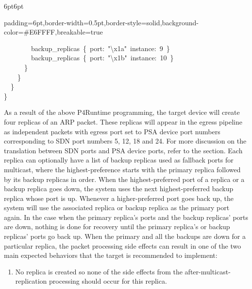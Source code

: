 \documentclass[11pt]{article}
\begin{document}
{\begin{mdbmargintb}{6pt}{6pt}
\begin{mdblock}{padding=6pt,border-width=0.5pt,border-style=solid,background-color=\#E6FFFF,breakable=true}
\begin{mdpre}
{{~~~~~~~~backup\_replicas~\{~port:~{"}{\textbackslash{}x1a}{"}~instance:~{9}~\}\\
~~~~~~~~backup\_replicas~\{~port:~{"}{\textbackslash{}x1b}{"}~instance:~{10}~\}\\
~~~~~~\}\\
~~~~\}\\
~~\}\\
\}}}%
\end{mdpre}%
\end{mdblock}%
\end{mdbmargintb}%

\noindent{}As a result of the above P4Runtime programming, the target device will create
four replicas of an ARP packet. These replicas will appear in the egress
pipeline as independent packets with egress port set to PSA device port numbers
corresponding to SDN port numbers 5, 12, 18 and 24. For more discussion on the
translation between SDN ports and PSA device ports, refer to the
 section. Each
replica can optionally have a list of backup replicas used as fallback ports
for multicast, where the highest-preference starts with the primary replica
followed by its backup replicas in order. When the highest-preferred port of a
replica or a backup replica goes down, the system uses the next
highest-preferred backup replica whose port is up. Whenever a higher-preferred
port goes back up, the system will use the associated replica or backup replica
as the primary port again. In the case when the primary replica's ports and the
backup replicas' ports are down, nothing is done for recovery until the primary
replica's or backup replicas' ports go back up. When the primary and all the
backups are down for a particular replica, the packet processing side effects
can result in one of the two main expected behaviors that the target is
recommended to implement:%

\begin{enumerate}%

\item{}
No replica is created so none of the side effects from the
after-multicast-replication processing should occur for this replica.%


\end{enumerate}}
\end{document}
